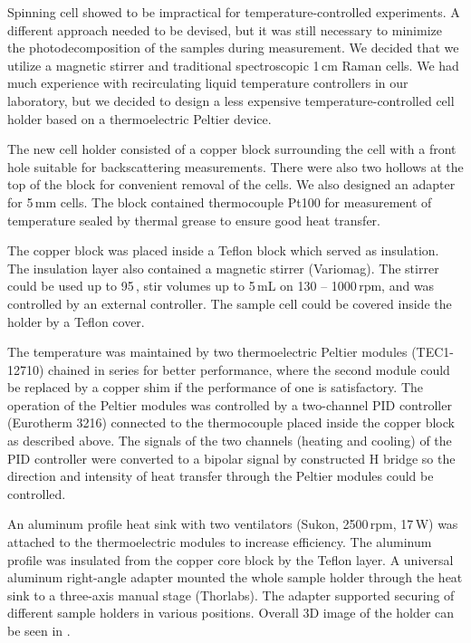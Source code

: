 Spinning cell
showed to be impractical for temperature-controlled experiments.
A different approach needed to be devised, but it was still necessary to
minimize the photodecomposition of the samples during measurement.
We decided that we utilize a magnetic stirrer and traditional spectroscopic
1\,cm Raman cells.
We had much experience with recirculating liquid temperature controllers in our
laboratory, but we decided to design a less expensive temperature-controlled
cell holder based on a thermoelectric Peltier device.

The new cell holder consisted of a copper block surrounding the cell
with a front hole suitable for backscattering measurements.
There were also two hollows at the top of the block for convenient removal of
the cells.
We also designed an adapter for 5\,mm cells.
The block contained thermocouple Pt100 for measurement of temperature sealed by
thermal grease to ensure good heat transfer.

The copper block was placed inside a Teflon block which served as insulation.
The insulation layer also contained a magnetic stirrer (Variomag).
The stirrer could be used up to 95\,\textcelsius{}, stir volumes up to 5\,mL on
130 -- 1000\,rpm, and was controlled by an external controller.
The sample cell could be covered inside the holder by a Teflon cover.

The temperature was maintained by two thermoelectric Peltier modules
(TEC1-12710) chained in series for better performance, where the second module
could be replaced by a copper shim if the performance of one is satisfactory.
The operation of the Peltier modules was controlled by a two-channel PID
controller (Eurotherm 3216) connected to the thermocouple placed inside the
copper block as described above.
The signals of the two channels (heating and cooling) of the PID controller
were converted to a bipolar signal by constructed H bridge so the direction
and intensity of heat transfer through the Peltier modules could be controlled.

An aluminum profile heat sink
with two ventilators (Sukon, 2500\,rpm, 17\,W) was attached to the
thermoelectric modules to increase efficiency.
The aluminum profile was insulated from the copper core block by the Teflon
layer.
A universal aluminum right-angle adapter
mounted the whole sample holder through the heat sink to a three-axis manual
stage (Thorlabs).
The adapter supported securing of different sample holders in various
positions. Overall 3D image of the holder can be seen in
.

